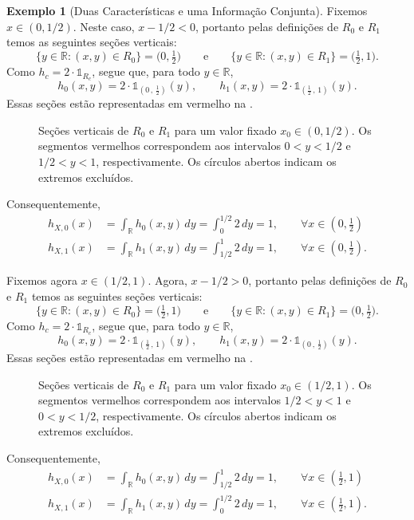 \documentclass[12pt,portuguese]{article}
\theoremstyle{definition}
\newtheorem{example}[example]{Exemplo}
\theoremstyle{plainexercise}
\theoremstyle{starredexercise}
\theoremstyle{definition}
\begin{document}
\begin{example}[Duas Características e uma Informação Conjunta]
Fixemos $x\in(0,1/2)$. Neste caso, $x-1/2<0$, portanto pelas definições de $R_0$ e $R_1$
temos as seguintes seções verticais:
\[
  \{y\in\mathbb{R}:(x,y)\in R_0\}=\bigl(0,\tfrac{1}{2}\bigr)
  \qquad \text{e}\qquad 
  \{y\in\mathbb{R}:(x,y)\in R_1\}=\bigl(\tfrac{1}{2},1\bigr).
\]
Como $h_c=2\cdot\mathds{1}_{R_c}$, segue que, para todo $y\in\mathbb{R}$,
\[
  h_0(x,y)=2\cdot\mathds{1}_{\left(0\,,\,\tfrac{1}{2}\right)}(y),
  \qquad
  h_1(x,y)=2\cdot\mathds{1}_{\left( \tfrac{1}{2}\,,\, 1\right)}(y).
\]
Essas seções estão representadas em vermelho na
.
\begin{figure}[H]
\centering

\captionsetup{width=\textwidth}
\caption{Seções verticais de $R_0$ e $R_1$ para um valor fixado
$x_0\in(0,1/2)$. Os segmentos vermelhos correspondem aos intervalos
$0<y<1/2$ e $1/2<y<1$, respectivamente. Os círculos abertos indicam os
extremos excluídos.}
\label{fig:secoes-verticais-classificacao}
\end{figure}
Consequentemente,
\begin{align}
  h_{X,0}(x)&=\int_{\mathbb{R}}h_0(x,y)\,dy
  =\int_0^{1/2}2\,dy=1, \qquad \forall x\in \left(0,\tfrac{1}{2}\right)
  \label{eq:marginal-x-classe0-esquerda}
  \\[0.2cm]
  h_{X,1}(x)&=\int_{\mathbb{R}}h_1(x,y)\,dy
  =\int_{1/2}^{1}2\,dy=1, \qquad \forall x\in \left(0,\tfrac{1}{2}\right).
  \label{eq:marginal-x-classe1-esquerda}
\end{align}

Fixemos agora $x\in(1/2,1)$. Agora, $x-1/2>0$, portanto pelas definições
de $R_0$ e $R_1$ temos as seguintes seções verticais:
\[
  \{y\in\mathbb{R}:(x,y)\in R_0\}=\bigl(\tfrac{1}{2},1\bigr)
  \qquad \text{e}\qquad
  \{y\in\mathbb{R}:(x,y)\in R_1\}=\bigl(0,\tfrac{1}{2}\bigr).
\]
Como $h_c=2\cdot\mathds{1}_{R_c}$, segue que, para todo $y\in\mathbb{R}$,
\[
  h_0(x,y)=2\cdot\mathds{1}_{\left(\tfrac{1}{2}\,,\,1\right)}(y),
  \qquad
  h_1(x,y)=2\cdot\mathds{1}_{\left(0\,,\,\tfrac{1}{2}\right)}(y).
\]
Essas seções estão representadas em vermelho na
.
\begin{figure}[H]
\centering

\captionsetup{width=\textwidth}
\caption{Seções verticais de $R_0$ e $R_1$ para um valor fixado
$x_0\in(1/2,1)$. Os segmentos vermelhos correspondem aos intervalos
$1/2<y<1$ e $0<y<1/2$, respectivamente. Os círculos abertos indicam os
extremos excluídos.}
\label{fig:secoes-verticais-classificacao-direita}
\end{figure}
Consequentemente,
\begin{align}
  h_{X,0}(x)&=\int_{\mathbb{R}}h_0(x,y)\,dy
  =\int_{1/2}^{1}2\,dy=1, \qquad \forall x\in\left(\tfrac{1}{2},1\right)
  \label{eq:marginal-x-classe0-direita}
  \\[0.2cm]
  h_{X,1}(x)&=\int_{\mathbb{R}}h_1(x,y)\,dy
  =\int_0^{1/2}2\,dy=1, \qquad \forall x\in\left(\tfrac{1}{2},1\right).
  \label{eq:marginal-x-classe1-direita}
\end{align}


\end{example}
\end{document}
